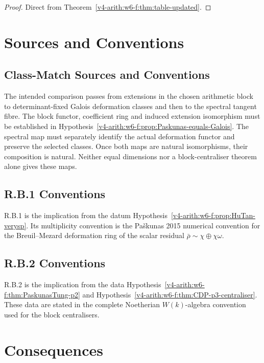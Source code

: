 \begin{proof}
Direct from Theorem~\ref{v4-arith:w6-f:thm:table-updated}.
\end{proof}

\section{Sources and Conventions}
\label{v4-arith:w6-f:disjointness-verification}

\subsection{Class-Match Sources and Conventions}

The intended comparison passes from extensions in the chosen
arithmetic block to determinant-fixed Galois deformation classes and
then to the spectral tangent fibre. The block functor, coefficient
ring and induced extension isomorphism must be established in
Hypothesis~\ref{v4-arith:w6-f:prop:Paskunas-equals-Galois}.
The spectral map must separately identify the actual deformation
functor and preserve the selected classes. Once both maps are natural
isomorphisms, their composition is natural. Neither equal dimensions
nor a block-centraliser theorem alone gives these maps.

\subsection{R.B.1 Conventions}

R.B.1 is the implication from the datum
Hypothesis~\ref{v4-arith:w6-f:prop:HuTan-verysp}. Its multiplicity convention is
the Pa\v skunas 2015 numerical convention for the Breuil--Mezard
deformation ring of the scalar residual
\(\bar\rho\sim\chi\oplus\chi\omega\).

\subsection{R.B.2 Conventions}

R.B.2 is the implication from the data
Hypothesis~\ref{v4-arith:w6-f:thm:PaskunasTung-p2} and
Hypothesis~\ref{v4-arith:w6-f:thm:CDP-p3-centraliser}. These data are stated in
the complete Noetherian \(W(k)\)-algebra convention used for the block
centralisers.

\section{Consequences}
\label{v4-arith:w6-f:summary}

